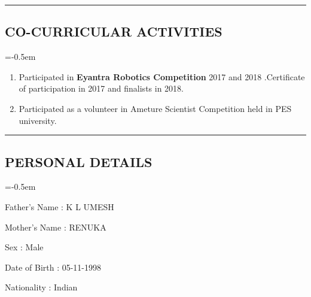 \documentclass[10pt,letterpaper]{article}
\begin{document}
\hrule
\subsection*{CO-CURRICULAR ACTIVITIES}
\parskip=-0.5em

\begin{enumerate}

	\item Participated in \textbf{Eyantra Robotics Competition } 2017 and 2018 .Certificate of participation in 2017 and finalists in 2018.
	\item Participated as a volunteer in Ameture Scientist Competition held in PES university.

\end{enumerate}

\pagebreak
\hrule
\subsection*{PERSONAL DETAILS}
\parskip=-0.5em

\begin{description}

\item Father's Name : K L UMESH 
\item Mother's Name : RENUKA 
\item Sex : Male 
\item Date of Birth : 05-11-1998
\item Nationality : Indian

\end{description}
\end{document}
